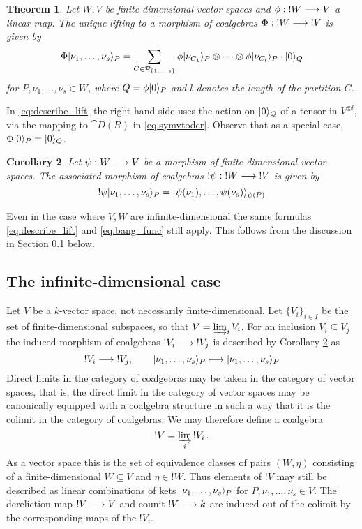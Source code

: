 \documentclass[english,letter paper,12pt,reqno]{article}
\DeclarePairedDelimiter\ket{\lvert}{\rangle}
\newtheorem{theorem}{Theorem}[section]
\newtheorem{corollary}[theorem]{Corollary}
\theoremstyle{example}
\numberwithin{equation}{section}
\begin{document}
\begin{theorem}\label{theorem:describe_lifting} Let $W, V$ be finite-dimensional vector spaces and $\phi: {!}W \longrightarrow V$ a linear map. The unique lifting to a morphism of coalgebras $\Phi: {!}W \longrightarrow {!}V$ is given by
\begin{equation}\label{eq:describe_lift}
\Phi \ket{ \nu_1, \ldots, \nu_s }_P = \sum_{C \in \cat{P}_{\{1,\ldots,s\}}} \phi \ket{ \nu_{C_{1}} }_P \otimes \cdots \otimes \phi \ket{ \nu_{C_{l}} }_P \cdot \ket{0}_Q
\end{equation}
for $P, \nu_1,\ldots,\nu_s \in W$, where $Q = \phi \ket{0}_P$ and $l$ denotes the length of the partition $C$.
\end{theorem}

In \eqref{eq:describe_lift} the right hand side uses the action on $\ket{0}_Q$ of a tensor in $V^{\otimes l}$, via the mapping to $\cat{D}(R)$ in \eqref{eq:symvtoder}. Observe that as a special case, $\Phi \ket{0}_P = \ket{0}_Q$.

\begin{corollary}\label{corollary:bang_func} Let $\psi: W \longrightarrow V$ be a morphism of finite-dimensional vector spaces. The associated morphism of coalgebras $!\psi: {!}W \longrightarrow {!}V$ is given by
\begin{equation}\label{eq:bang_func}
!\psi \ket{\nu_1, \ldots, \nu_s}_P = \ket{ \psi(\nu_{1}), \ldots, \psi(\nu_{s}) }_{\psi(P)}
\end{equation}
\end{corollary}

Even in the case where $V, W$ are infinite-dimensional the same formulas \eqref{eq:describe_lift} and \eqref{eq:bang_func} still apply. This follows from the discussion in Section \ref{section:infinite_dim} below.

\subsection{The infinite-dimensional case}\label{section:infinite_dim}

Let $V$ be a $k$-vector space, not necessarily finite-dimensional. Let $\{ V_i \}_{i \in I}$ be the set of finite-dimensional subspaces, so that $V = \varinjlim_i V_i$. For an inclusion $V_i \subseteq V_j$ the induced morphism of coalgebras ${!}V_i \longrightarrow {!}V_j$ is described by Corollary \ref{corollary:bang_func} as
\[
!V_i \lto {!}V_j, \qquad \ket{\nu_1,\ldots,\nu_s}_P \longmapsto \ket{\nu_1,\ldots,\nu_s}_P
\]
Direct limits in the category of coalgebras may be taken in the category of vector spaces, that is, the direct limit in the category of vector spaces may be canonically equipped with a coalgebra structure in such a way that it is the colimit in the category of coalgebras. We may therefore define a coalgebra
\[
!V = \varinjlim_i {!}V_i\,.
\]
As a vector space this is the set of equivalence classes of pairs $(W, \eta)$ consisting of a finite-dimensional $W \subseteq V$ and $\eta \in {!}W$. Thus elements of ${!} V$ may still be described as linear combinations of kets $\ket{\nu_1,\ldots,\nu_s}_P$ for $P, \nu_1,\ldots,\nu_s \in V$. The dereliction map ${!} V \longrightarrow V$ and counit ${!} V \longrightarrow k$ are induced out of the colimit by the corresponding maps of the ${!}V_i$.
\end{document}
